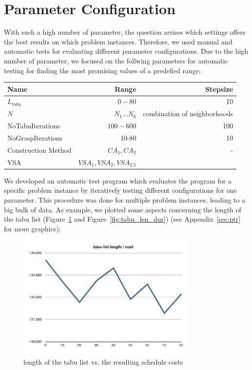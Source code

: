 \documentclass[a4paper,11pt]{article}
\begin{document}
\section{Parameter Configuration}
With such a high number of parameter, the question arrises which settings offers the best results on which problem instances. Therefore, we used manual and 
automatic tests for evaluating different parameter configurations.
Due to the high number of parameter, we focused on the follwing parameters for automatic testing for finding the most promising values of a predefied range:

\begin{center}
\begin{tabular}{| l | r |r | }
  \hline                       
  Name & Range & Stepsize \\   \hline     \hline    
  $L_{tabu}$ &  $0-80$& 10\\ \hline    
  $N$ &  $N_1 ... N_6$ & combination of neighborhoods\\ \hline   
  NoTabuIterations & $100-600$  & 100 \\ \hline  
  NoGraspIterations &  10-80 & 10  \\ \hline 
  Construction Method &  $CA_1, CA_2 $& - \\ \hline 
  VSA & $ VSA_1, VSA_2, VSA_{2.5}$  & \\ \hline 
\end{tabular}
\end{center}

We developed an automatic test program which evaluates the program for a specific problem instance 
by iteratively testing different configurations for one parameter. This procedure was done for multiple problem instances, leading to a big bulk of data.
As example, we plotted some aspects concerning the length of the tabu list (Figure~\ref{fig:tabu_len_cost} and Figure~\ref{fig:tabu_len_dur}) 
(see Appendix~\ref{sec:ptr} for more graphics):

\begin{figure}[htb]
  \begin{center}
    \includegraphics[width=0.8\textwidth]{images/tabulist-len-cost}
  \end{center}
  \caption{length of the tabu list vs. the resulting schedule costs}
  \label{fig:tabu_len_cost}
\end{figure}
\end{document}

